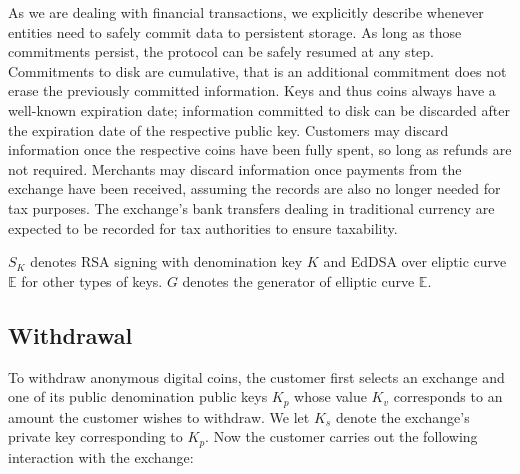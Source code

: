 \documentclass{llncs}
\begin{document}
As we are dealing with financial transactions, we explicitly describe
whenever entities need to safely commit data to persistent storage.
As long as those commitments persist, the protocol can be safely
resumed at any step.  Commitments to disk are cumulative, that is an
additional commitment does not erase the previously committed
information.  Keys and thus coins always have a well-known expiration
date; information committed to disk can be discarded after the
expiration date of the respective public key.
Customers may discard information once the respective coins have been
fully spent, so long as refunds are not required.
Merchants may discard information once payments from the exchange have
been received, assuming the records are also no longer needed for tax
purposes.  The exchange's bank transfers dealing in traditional currency
are expected to be recorded for tax authorities to ensure taxability.

$S_K$ denotes RSA signing with denomination key $K$ and EdDSA
over eliptic curve $\mathbb{E}$ for other types of keys.
$G$ denotes the generator of elliptic curve $\mathbb{E}$.

\subsection{Withdrawal}

To withdraw anonymous digital coins, the customer first selects an
exchange and one of its public denomination public keys $K_p$ whose
value $K_v$ corresponds to an amount the customer wishes to withdraw.
We let $K_s$ denote the exchange's private key corresponding to $K_p$.
Now the customer carries out the following interaction with the exchange:


\end{document}
